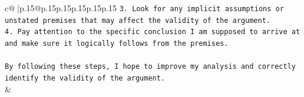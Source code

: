 \documentclass{article}
\begin{document}
{\begin{supertabular}{c@{$\;$}|p{.15\linewidth}@{}p{.15\linewidth}p{.15\linewidth}p{.15\linewidth}p{.15\linewidth}p{.15\linewidth}}
{{{\texttt{3. Look for any implicit assumptions or unstated premises that may affect the validity of the argument.} \\
\texttt{4. Pay attention to the specific conclusion I am supposed to arrive at and make sure it logically follows from the premises.} \\
\\ 
\texttt{By following these steps, I hope to improve my analysis and correctly identify the validity of the argument.} \\
            }
        }
    }
    & \\ \\

\end{supertabular}
}
\end{document}

